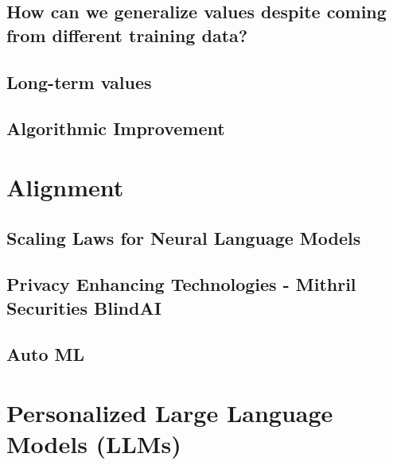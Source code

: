 \documentclass[
]{book}
\begin{document}
\hypertarget{how-can-we-generalize-values-despite-coming-from-different-training-data}{%
\section{How can we generalize values despite coming from different training data?}\label{how-can-we-generalize-values-despite-coming-from-different-training-data}}

\hypertarget{long-term-values}{%
\section{Long-term values}\label{long-term-values}}

\hypertarget{algorithmic-improvement}{%
\section{Algorithmic Improvement}\label{algorithmic-improvement}}

\hypertarget{alignment-1}{%
\chapter{Alignment}\label{alignment-1}}

\hypertarget{scaling-laws-for-neural-language-models}{%
\section{Scaling Laws for Neural Language Models}\label{scaling-laws-for-neural-language-models}}

\hypertarget{privacy-enhancing-technologies---mithril-securities-blindai}{%
\section{Privacy Enhancing Technologies - Mithril Securities BlindAI}\label{privacy-enhancing-technologies---mithril-securities-blindai}}

\hypertarget{auto-ml}{%
\section{Auto ML}\label{auto-ml}}

\hypertarget{personalized-large-language-models-llms}{%
\chapter{Personalized Large Language Models (LLMs)}\label{personalized-large-language-models-llms}}
\end{document}
